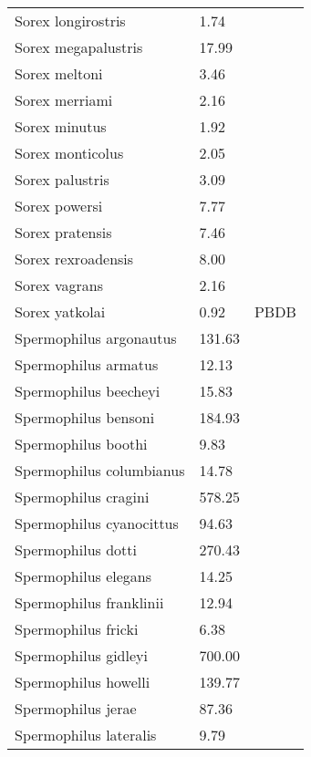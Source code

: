 \begin{longtable}{p{} p{} p{}}
    Sorex longirostris & 1.74 & \cite{Smith2004} \\ 
    Sorex megapalustris & 17.99 & \cite{Tomiya2013} \\ 
    Sorex meltoni & 3.46 & \cite{Tomiya2013} \\ 
    Sorex merriami & 2.16 & \cite{Smith2004} \\ 
    Sorex minutus & 1.92 & \cite{Smith2004} \\ 
    Sorex monticolus & 2.05 & \cite{Smith2004} \\ 
    Sorex palustris & 3.09 & \cite{Smith2004} \\ 
    Sorex powersi & 7.77 & \cite{Tomiya2013} \\ 
    Sorex pratensis & 7.46 & \cite{Tomiya2013} \\ 
    Sorex rexroadensis & 8.00 & \cite{McKenna2011} \\ 
    Sorex vagrans & 2.16 & \cite{Smith2004} \\ 
    Sorex yatkolai & 0.92 & PBDB \\ 
    Spermophilus argonautus & 131.63 & \cite{Tomiya2013} \\ 
    Spermophilus armatus & 12.13 & \cite{Smith2004} \\ 
    Spermophilus beecheyi & 15.83 & \cite{Smith2004} \\ 
    Spermophilus bensoni & 184.93 & \cite{Tomiya2013} \\ 
    Spermophilus boothi & 9.83 & \cite{Secord2008a} \\ 
    Spermophilus columbianus & 14.78 & \cite{Smith2004} \\ 
    Spermophilus cragini & 578.25 & \cite{Tomiya2013} \\ 
    Spermophilus cyanocittus & 94.63 & \cite{Tomiya2013} \\ 
    Spermophilus dotti & 270.43 & \cite{Tomiya2013} \\ 
    Spermophilus elegans & 14.25 & \cite{Smith2004} \\ 
    Spermophilus franklinii & 12.94 & \cite{Smith2004} \\ 
    Spermophilus fricki & 6.38 & \cite{Simons1960} \\ 
    Spermophilus gidleyi & 700.00 & \cite{McKenna2011} \\ 
    Spermophilus howelli & 139.77 & \cite{Tomiya2013} \\ 
    Spermophilus jerae & 87.36 & \cite{Tomiya2013} \\ 
    Spermophilus lateralis & 9.79 & \cite{Smith2004} \\ 

\end{longtable}
